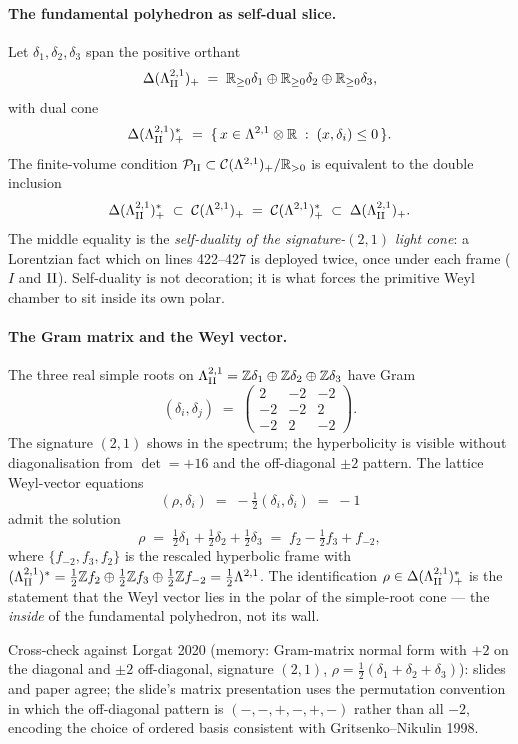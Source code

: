 \paragraph{The fundamental polyhedron as self-dual slice.} Let
$\delta_1,\delta_2,\delta_3$ span the positive orthant
\[
  \Delta(\Lambda^{2,1}_{\mathrm{II}})_+ \;=\; \mathbb{R}_{\ge 0}\delta_1 \oplus \mathbb{R}_{\ge 0}\delta_2 \oplus \mathbb{R}_{\ge 0}\delta_3,
\]
with dual cone
\[
  \Delta(\Lambda^{2,1}_{\mathrm{II}})^{*}_{+} \;=\; \{\, x \in \Lambda^{2,1}\otimes\mathbb{R} \;:\; (x,\delta_i) \le 0 \,\}.
\]
The finite-volume condition $\mathcal{P}_{\mathrm{II}} \subset \mathcal{C}(\Lambda^{2,1})_+ / \mathbb{R}_{>0}$
is equivalent to the double inclusion
\[
  \Delta(\Lambda^{2,1}_{\mathrm{II}})^{*}_{+}
  \;\subset\;
  \mathcal{C}(\Lambda^{2,1})_+
  \;=\;
  \mathcal{C}(\Lambda^{2,1})^{*}_{+}
  \;\subset\;
  \Delta(\Lambda^{2,1}_{\mathrm{II}})_+.
\]
The middle equality is the \emph{self-duality of the signature-$(2,1)$
light cone}: a Lorentzian fact which on lines 422–427 is deployed
twice, once under each frame ($I$ and $\mathrm{II}$). Self-duality is not
decoration; it is what forces the primitive Weyl chamber to sit
inside its own polar.

\paragraph{The Gram matrix and the Weyl vector.} The three real
simple roots on $\Lambda^{2,1}_{\mathrm{II}} = \mathbb{Z}\delta_1\oplus\mathbb{Z}\delta_2\oplus\mathbb{Z}\delta_3$
have Gram
\[
  (\delta_i,\delta_j) \;=\;
  \begin{pmatrix} 2 & -2 & -2 \\ -2 & -2 & 2 \\ -2 & 2 & -2 \end{pmatrix}.
\]
The signature $(2,1)$ shows in the spectrum; the hyperbolicity
is visible without diagonalisation from $\det = +16$ and the
off-diagonal $\pm 2$ pattern. The lattice Weyl-vector equations
\[
  (\rho,\delta_i) \;=\; -\tfrac{1}{2}(\delta_i,\delta_i) \;=\; -1
\]
admit the solution
\[
  \rho \;=\; \tfrac{1}{2}\delta_1 + \tfrac{1}{2}\delta_2 + \tfrac{1}{2}\delta_3
       \;=\; f_2 - \tfrac{1}{2} f_3 + f_{-2},
\]
where $\{f_{-2},f_3,f_2\}$ is the rescaled hyperbolic frame with
$(\Lambda^{2,1}_{\mathrm{II}})^* = \tfrac{1}{2}\mathbb{Z} f_2 \oplus \tfrac{1}{2}\mathbb{Z} f_3 \oplus \tfrac{1}{2}\mathbb{Z} f_{-2}
 = \tfrac{1}{2}\Lambda^{2,1}$. The identification
$\rho \in \Delta(\Lambda^{2,1}_{\mathrm{II}})^{*}_{+}$ is the statement that the
Weyl vector lies in the polar of the simple-root cone — the
\emph{inside} of the fundamental polyhedron, not its wall.

Cross-check against Lorgat 2020 (memory: Gram-matrix normal form with
$+2$ on the diagonal and $\pm 2$ off-diagonal, signature $(2,1)$,
$\rho = \tfrac{1}{2}(\delta_1+\delta_2+\delta_3)$): slides and paper
agree; the slide's matrix presentation uses the permutation convention
in which the off-diagonal pattern is $(-,-,+,-,+,-)$ rather than all
$-2$, encoding the choice of ordered basis consistent with Gritsenko–Nikulin
1998.


